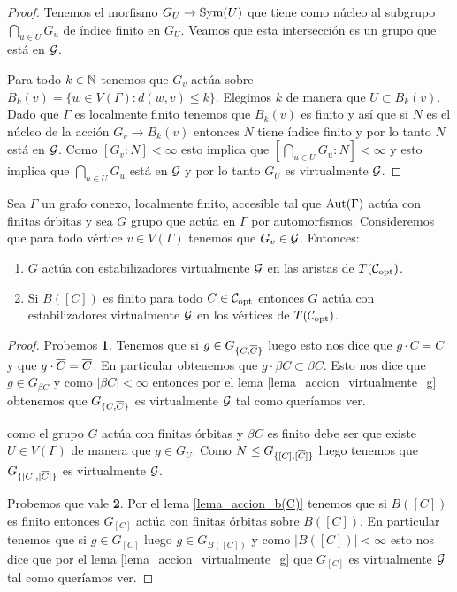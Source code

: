 \documentclass[tesis.tex]{subfiles}
\begin{document}
\begin{proof}
	Tenemos el morfismo $G_{U} \to \text{Sym}(U)$ que tiene como núcleo al subgrupo $\bigcap_{u \in U} G_u$ de índice finito en $G_U$.
	Veamos que esta intersección es un grupo que está en ${\cal G}$.
	
	Para todo $k \in \mathbb{N}$ tenemos que $G_{v}$ actúa sobre $B_{k}(v) = \{ w \in V(\Gamma) : d(w,v) \le k  \}$.
	Elegimos $k$ de manera que ${ U} \subset B_{k}(v)$.
	Dado que $\Gamma$ es localmente finito tenemos que $B_{k}(v)$ es finito y así que si $N$ es el núcleo de la acción $G_{v} \to B_{k}(v)$ entonces $N$ tiene índice finito y por lo tanto $N$ está en ${\cal G}$.
	Como $[G_{v} : N] < \infty$ esto implica que $ [\bigcap_{u \in U} G_{u} : N] < \infty$
	y esto implica que $ \bigcap_{u \in U} G_{u}$ está en ${\cal G}$ y por lo tanto $G_{ U}$ es virtualmente ${\cal G}$.
\end{proof}


\begin{prop}\label{prop_clase_grupos_accion}
	Sea $\Gamma$ un grafo conexo, localmente finito, accesible tal que $\text{Aut}(\Gamma)$ actúa con finitas órbitas y sea $G$ grupo que actúa en $\Gamma$ por automorfismos.
	Consideremos que para todo vértice $v \in V(\Gamma)$ tenemos que $G_{v} \in {\cal G}$.
	Entonces:
	\begin{enumerate}
		\item $G$ actúa con estabilizadores virtualmente ${\cal G}$ en las aristas de $T({\cal C}_{\text{opt}})$.
		\item Si $B([C])$ es finito para todo $C \in {\cal C}_{\text{opt}}$ entonces $G$ actúa con estabilizadores virtualmente ${\cal G}$ en los vértices de $T({\cal C}_{\text{opt}})$.
	\end{enumerate}	
\end{prop}

\begin{proof}
	Probemos \textbf{1}.
	Tenemos que si $g \in G_{\{C,\overline C\}}$ luego esto nos dice que $g \cdot C = C $ y que $g \cdot \overline C = \overline C$. 
	En particular obtenemos que $g \cdot \beta C \subset \beta C$.
	Esto nos dice que $g \in G_{\beta C}$ y como $|\beta C| < \infty$ entonces por el lema \ref{lema_accion_virtualmente_g} obtenemos que $G_{\{C,\overline C\}}$ es virtualmente ${\cal G}$ tal como queríamos ver.
	
	como el grupo $G$ actúa con finitas órbitas y $\beta C$ es finito debe ser que existe $U \in V(\Gamma)$ de manera que $g \in G_{U}$.
	Como $N \le G_{\{[C],[\overline C]\}}$ luego tenemos que $G_{\{[C],[\overline C]\}}$ es virtualmente ${\cal G}$.
	
	Probemos que vale \textbf{2}.
	Por el lema \ref{lema_accion_b(C)} tenemos que si $B([C])$ es finito entonces $G_{[C]}$ actúa con finitas órbitas sobre $B([C])$.
	En particular tenemos que si $g \in G_{[C]}$ luego $g \in G_{B([C])}$ y como $|B([C])| < \infty$ esto nos dice que por el lema \ref{lema_accion_virtualmente_g} que $G_{[C]}$ es virtualmente ${\cal G}$ tal como queríamos ver.
	
\end{proof}
\end{document}
